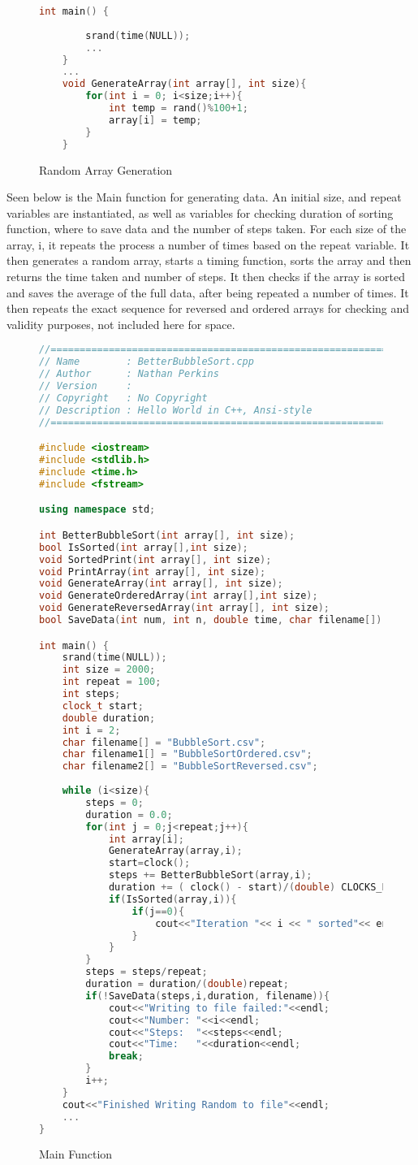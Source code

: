 \documentclass[]{article}
\begin{document}
\begin{figure}[H]\label{SrandImp}
	\caption{Random Array Generation}
	\begin{lstlisting}[language=c++]
	int main() {
	
		srand(time(NULL));
		...
	}
	...
	void GenerateArray(int array[], int size){
		for(int i = 0; i<size;i++){
			int temp = rand()%100+1;
			array[i] = temp;
		}
	}
	\end{lstlisting}
\end{figure}
Seen below is the Main function for generating data. An initial size, and repeat variables are instantiated, as well as variables for checking duration of sorting function, where to save data and the number of steps taken. For each size of the array, i, it repeats the process a number of times based on the repeat variable. It then generates a random array, starts a timing function, sorts the array and then returns the time taken and number of steps. It then checks if the array is sorted and saves the average of the full data, after being repeated a number of times. It then repeats the exact sequence for reversed and ordered arrays for checking and validity purposes, not included here for space.
\begin{figure}[H]\label{MainFunc}
	\caption{Main Function}
	\begin{lstlisting}[language=c++]
//================================================================
// Name        : BetterBubbleSort.cpp
// Author      : Nathan Perkins
// Version     :
// Copyright   : No Copyright
// Description : Hello World in C++, Ansi-style
//================================================================

#include <iostream>
#include <stdlib.h>
#include <time.h>
#include <fstream>

using namespace std;

int BetterBubbleSort(int array[], int size);
bool IsSorted(int array[],int size);
void SortedPrint(int array[], int size);
void PrintArray(int array[], int size);
void GenerateArray(int array[], int size);
void GenerateOrderedArray(int array[],int size);
void GenerateReversedArray(int array[], int size);
bool SaveData(int num, int n, double time, char filename[]);

int main() {
	srand(time(NULL));
	int size = 2000;
	int repeat = 100;
	int steps;
	clock_t start;
	double duration;
	int i = 2;
	char filename[] = "BubbleSort.csv";
	char filename1[] = "BubbleSortOrdered.csv";
	char filename2[] = "BubbleSortReversed.csv";
	
	while (i<size){
		steps = 0;
		duration = 0.0;
		for(int j = 0;j<repeat;j++){
			int array[i];
			GenerateArray(array,i);
			start=clock();
			steps += BetterBubbleSort(array,i);
			duration += ( clock() - start)/(double) CLOCKS_PER_SEC;
			if(IsSorted(array,i)){
				if(j==0){
					cout<<"Iteration "<< i << " sorted"<< endl;
				}
			}
		}
		steps = steps/repeat;
		duration = duration/(double)repeat;
		if(!SaveData(steps,i,duration, filename)){
			cout<<"Writing to file failed:"<<endl;
			cout<<"Number: "<<i<<endl;
			cout<<"Steps:  "<<steps<<endl;
			cout<<"Time:   "<<duration<<endl;
			break;
		}
		i++;
	}
	cout<<"Finished Writing Random to file"<<endl;
	...
}
	\end{lstlisting}
\end{figure}
\end{document}
